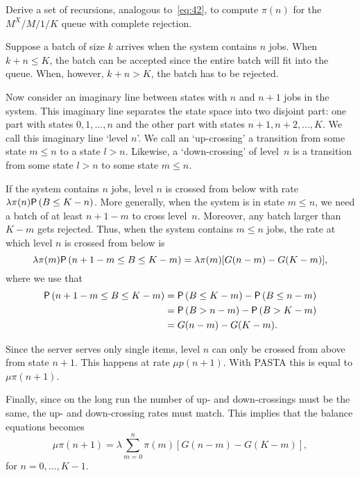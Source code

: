 \begin{exercise}
  Derive a set of recursions, analogous to~\cref{eq:42}, to compute $\pi(n)$ for the $M^X/M/1/K$ queue with complete rejection.
\begin{solution}
  Suppose a batch of size $k$ arrives when the system contains $n$ jobs.
  When $k+n \leq K$, the batch can be accepted since the entire batch will fit into the queue.
  When, however, $k+n> K$, the batch has to be rejected.

  Now consider an imaginary line between states with $n$ and $n+1$ jobs in the system.
  This imaginary line separates the state space into two disjoint part: one part with states $0, 1, \ldots, n$ and the other part with states $n+1, n+2, \ldots, K$.
  We call this imaginary line `level $n$'.
  We call an `up-crossing' a transition from some state $m\leq n$ to a state $l> n$.
  Likewise, a `down-crossing' of level~$n$ is a transition from some state $l> n$ to some state $m\leq n$.

  If the system contains $n$ jobs, level $n$ is crossed from below with rate $\lambda \pi(n) \P{B \leq K-n}$.
  More generally, when the system is in state $m\leq n$, we need a batch of at least $n+1-m$ to cross level~$n$.
  Moreover, any batch larger than $K-m$ gets rejected.
  Thus, when the system contains $m \leq n $ jobs, the rate at which level $n$ is crossed from below is
  \begin{equation*}
  \lambda \pi(m) \P{n+1-m\leq B \leq K-m}  = \lambda \pi(m)
  [G(n-m)-G(K-m)],
  \end{equation*}
where we use that
\begin{align*}
\P{n+1-m\leq B \leq K-m} 
&= \P{B \leq K-m} - \P{B \leq n-m}  \\
&= \P{B > n-m} - \P{B > K-m} \\
&= G(n-m)-G(K-m).
\end{align*}

  Since the server serves only single items, level $n$ can only be
  crossed from above from state $n+1$. This happens at rate $\mu p(n+1)$. With PASTA this is equal to $\mu \pi(n+1)$.

  Finally, since on the long run the number of up- and down-crossings must
  be the same, the up- and down-crossing rates must match. This implies
  that the balance equations becomes
  \begin{equation*}
    \mu \pi(n+1) = \lambda \sum_{m=0}^n \pi(m)   [G(n-m)-G(K-m)],
  \end{equation*}
  for $n=0,\ldots, K-1$. 


\end{solution}
\end{exercise}
